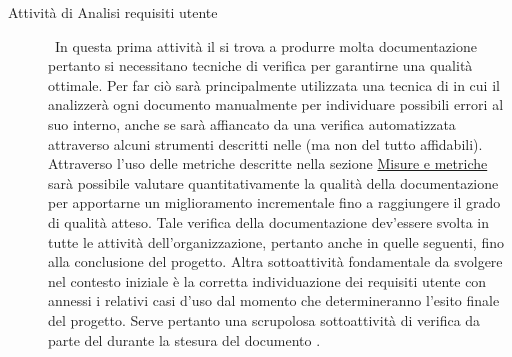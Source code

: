 \documentclass[a4paper, titlepage]{article}
\begin{document}
\begin{description}
\item[Attività di Analisi requisiti utente]
\ 
\newline In questa prima attività il  si trova a produrre molta documentazione pertanto si necessitano tecniche di verifica per garantirne una qualità ottimale. Per far ciò sarà principalmente utilizzata una tecnica di  in cui il  analizzerà ogni documento manualmente per individuare possibili errori al suo interno, anche se sarà affiancato da una verifica automatizzata attraverso alcuni strumenti descritti nelle  (ma non del tutto affidabili).
\newline Attraverso l'uso delle metriche descritte nella sezione \hyperref[sec:metr]{Misure e metriche} sarà possibile valutare quantitativamente la qualità della documentazione per apportarne un miglioramento incrementale fino a raggiungere il grado di qualità atteso. 
\newline Tale verifica della documentazione dev'essere svolta in tutte le attività dell'organizzazione, pertanto anche in quelle seguenti, fino alla conclusione del progetto.
\newline Altra sottoattività fondamentale da svolgere nel contesto iniziale è la corretta individuazione dei requisiti utente con annessi i relativi casi d'uso dal momento che determineranno l'esito finale del progetto. Serve pertanto una scrupolosa sottoattività di verifica da parte del  durante la stesura del documento .


\end{description}
\end{document}
